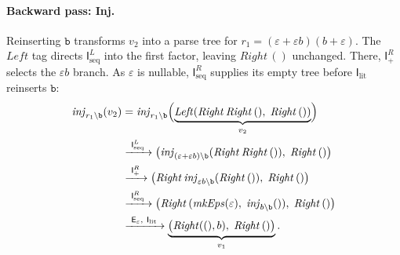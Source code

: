 \paragraph{Backward pass: Inj.}
Reinserting $\mathtt{b}$ transforms $v_2$ into a parse tree for
$r_1=(\varepsilon+\varepsilon b)(b+\varepsilon)$.
The $\mathit{Left}$ tag directs $\mathsf{I}_{\mathrm{seq}}^{L}$ 
into the first factor, leaving $\mathit{Right}\,()$ unchanged.
There, $\mathsf{I}_{+}^{R}$ selects the $\varepsilon b$ branch.
As $\varepsilon$ is nullable, $\mathsf{I}_{\mathrm{seq}}^{R}$
supplies its empty tree before $\mathsf{I}_{\mathrm{lit}}$ reinserts $\mathtt{b}$:
\[
\begin{aligned}
\mathit{inj}_{r_1 \backslash \mathtt{b}}(v_2)
  &= \mathit{inj}_{r_1 \backslash \mathtt{b}}\Bigl(
       \underbrace{\mathit{Left}(\mathit{Right}\,\mathit{Right}\,(),\;
                    \mathit{Right}\,())}_{v_2}\Bigr)\\
  &\xrightarrow{\ \mathsf{I}_{\mathrm{seq}}^{L}\ }
    \bigl(\mathit{inj}_{(\varepsilon+\varepsilon b)
          \backslash \mathtt{b}}(\mathit{Right}\,\mathit{Right}\,()),\;
          \mathit{Right}\,()\bigr)\\
  &\xrightarrow{\ \mathsf{I}_{+}^{R}\ }
    \bigl(\mathit{Right}\,
          \mathit{inj}_{\varepsilon b \backslash \mathtt{b}}
          (\mathit{Right}\,()),\;
          \mathit{Right}\,()\bigr)\\
  &\xrightarrow{\ \mathsf{I}_{\mathrm{seq}}^{R}\ }
    \bigl(\mathit{Right}\,
          (\mathit{mkEps}(\varepsilon),\;
           \mathit{inj}_{b \backslash \mathtt{b}}()),\;
          \mathit{Right}\,()\bigr)\\
  &\xrightarrow{\ \mathsf{E}_{\varepsilon},\ \mathsf{I}_{\mathrm{lit}}\ }
    \underbrace{\bigl(\mathit{Right}((), b),\;
          \mathit{Right}\,()\bigr)}_{v_1}.
\end{aligned}
\]

